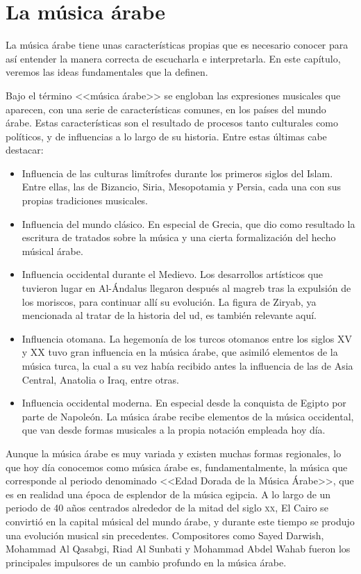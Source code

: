 \chapter{La música árabe}

    La música árabe tiene unas características propias que es necesario conocer para así entender la manera correcta de escucharla e interpretarla. En este capítulo, veremos las ideas fundamentales que la definen.

    Bajo el término <<música árabe>> se engloban las expresiones musicales que aparecen, con una serie de características comunes, en los países del mundo árabe. Estas características son el resultado de procesos tanto culturales como políticos, y de influencias a lo largo de su historia. Entre estas últimas cabe destacar:

    \begin{itemize}
    \item Influencia de las culturas limítrofes durante los primeros siglos del Islam. Entre ellas, las de Bizancio, Siria, Mesopotamia y Persia, cada una con sus propias tradiciones musicales.
    \item Influencia del mundo clásico. En especial de Grecia, que dio como resultado la escritura de tratados sobre la música y una cierta formalización del hecho músical árabe.
    \item Influencia occidental durante el Medievo. Los desarrollos artísticos que tuvieron lugar en Al-Ándalus llegaron después al magreb tras la expulsión de los moriscos, para continuar allí su evolución. La figura de Ziryab, ya mencionada al tratar de la historia del ud, es también relevante aquí.
    \item Influencia otomana. La hegemonía de los turcos otomanos entre los siglos \textsc{XV} y \textsc{XX} tuvo gran influencia en la música árabe, que asimiló elementos de la música turca, la cual a su vez había recibido antes la influencia de las de Asia Central, Anatolia o Iraq, entre otras.
    \item Influencia occidental moderna. En especial desde la conquista de Egipto por parte de Napoleón. La música árabe recibe elementos de la música occidental, que van desde formas musicales a la propia notación empleada hoy día.
    \end{itemize}

    Aunque la música árabe es muy variada y existen muchas formas regionales, lo que hoy día conocemos como música árabe es, fundamentalmente, la música que corresponde al periodo denominado <<Edad Dorada de la Música Árabe>>, que es en realidad una época de esplendor de la música egipcia. A lo largo de un periodo de 40 años centrados alrededor de la mitad del siglo \textsc{xx}, El Cairo se convirtió en la capital músical del mundo árabe, y durante este tiempo se produjo una evolución musical sin precedentes. Compositores como Sayed Darwish, Mohammad Al Qasabgi, Riad Al Sunbati y Mohammad Abdel Wahab fueron los principales impulsores de un cambio profundo en la música árabe. 

